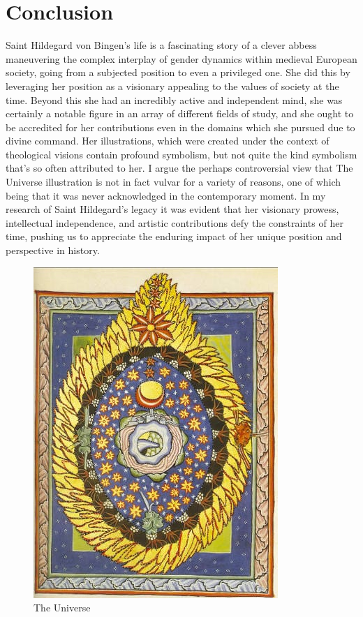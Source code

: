 \documentclass{turabian-researchpaper}
\begin{document}
\section{Conclusion}
    
    Saint Hildegard von Bingen's life is a fascinating story of a clever abbess maneuvering the complex interplay of gender dynamics within medieval European society, going from a subjected position to even a privileged one. She did this by leveraging her position as a visionary appealing to the values of society at the time. Beyond this she had an incredibly active and independent mind, she was certainly a notable figure in an array of different fields of study, and she ought to be accredited for her contributions even in the domains which she pursued due to divine command. Her illustrations, which were created under the context of theological visions contain profound symbolism, but not quite the kind symbolism that's so often attributed to her. I argue the perhaps controversial view that The Universe illustration is not in fact vulvar for a variety of reasons, one of which being that it was never acknowledged in the contemporary moment. In my research of Saint Hildegard's legacy it was evident that her visionary prowess, intellectual independence, and artistic contributions defy the constraints of her time, pushing us to appreciate the enduring impact of her unique position and perspective in history.

\begin{figure}
    \includegraphics{universe.jpeg}
    \caption{The Universe\autocite{hh}}
    \label{The Universe}
\end{figure}
\end{document}
